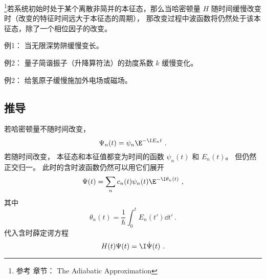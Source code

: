 

\begin{issues}
\issueDraft
\end{issues}

\footnote{参考 \cite{GriffE} 章节： The Adiabatic Approximation}若系统初始时处于某个离散非简并的本征态，那么当哈密顿量 $H$ 随时间缓慢改变时（改变的特征时间远大于本征态的周期）， 那改变过程中波函数将仍然处于该本征态，除了一个相位因子的改变。

例1： 当无限深势阱缓慢变长。

例2： 量子简谐振子（升降算符法）的劲度系数 $k$ 缓慢变化。

例2： 给氢原子缓慢施加外电场或磁场。

\subsection{推导}
若哈密顿量不随时间改变，
\begin{equation}
\Psi_n(t) = \psi_n \E^{-\I E_n t}~.
\end{equation}
若随时间改变， 本征态和本征值都变为时间的函数 $\psi_n(t)$ 和 $E_n(t)$。 但仍然正交归一。 此时的含时波函数仍然可以用它们展开
\begin{equation}
\Psi(t) = \sum_n c_n(t) \psi_n(t) \E^{-\I \theta_n(t)}~,
\end{equation}
其中
\begin{equation}
\theta_n(t) = \frac{1}{\hbar} \int_0^t E_n(t')\dd{t'}~.
\end{equation}
代入含时薛定谔方程
\begin{equation}
H(t)\Psi(t) = \I \dot \Psi(t)~.
\end{equation}

